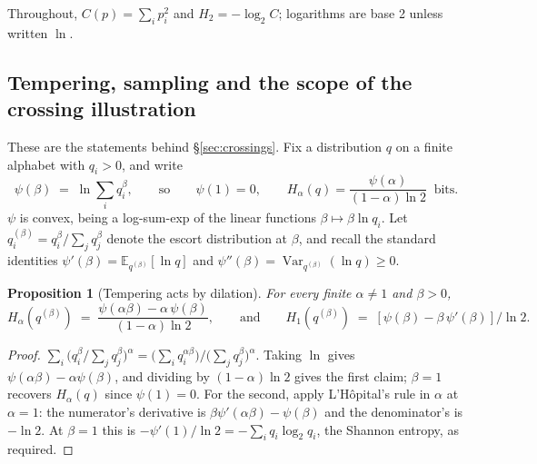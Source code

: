 \documentclass[10pt]{article}
\theoremstyle{plain}
\newtheorem{proposition}{Proposition}
\theoremstyle{definition}
\newcommand{\Htwo}{H_2}
\begin{document}
Throughout, $C(p)=\sum_i p_i^2$ and $\Htwo=-\log_2 C$; logarithms are base 2 unless written $\ln$.

\subsection{Tempering, sampling and the scope of the crossing illustration}
\label{app:crossings}

These are the statements behind \S\ref{sec:crossings}. Fix a distribution $q$ on a finite alphabet with $q_i>0$, and write
\[
\psi(\beta)\;=\;\ln\sum_i q_i^{\beta},
\qquad\text{so}\qquad \psi(1)=0,\qquad H_\alpha(q)=\frac{\psi(\alpha)}{(1-\alpha)\ln2}\ \text{ bits}.
\]
$\psi$ is convex, being a log-sum-exp of the linear functions $\beta\mapsto\beta\ln q_i$. Let $q^{(\beta)}_i=q_i^\beta/\sum_j q_j^\beta$ denote the escort distribution at $\beta$, and recall the standard identities $\psi'(\beta)=\mathbb{E}_{q^{(\beta)}}[\ln q]$ and $\psi''(\beta)=\operatorname{Var}_{q^{(\beta)}}(\ln q)\ge0$.

\begin{proposition}[Tempering acts by dilation]
\label{prop:temper}
For every finite $\alpha\ne1$ and $\beta>0$,
\[
H_\alpha\!\left(q^{(\beta)}\right)\;=\;\frac{\psi(\alpha\beta)-\alpha\,\psi(\beta)}{(1-\alpha)\ln2},
\qquad\text{and}\qquad
H_1\!\left(q^{(\beta)}\right)\;=\;[\psi(\beta)-\beta\,\psi'(\beta)]/\ln2.
\]
\end{proposition}
\begin{proof}
$\sum_i\big(q_i^\beta/\sum_j q_j^\beta\big)^\alpha=\big(\sum_i q_i^{\alpha\beta}\big)\big/\big(\sum_j q_j^{\beta}\big)^{\alpha}$. Taking $\ln$ gives $\psi(\alpha\beta)-\alpha\psi(\beta)$, and dividing by $(1-\alpha)\ln2$ gives the first claim; $\beta=1$ recovers $H_\alpha(q)$ since $\psi(1)=0$. For the second, apply L'H\^opital's rule in $\alpha$ at $\alpha=1$: the numerator's derivative is $\beta\psi'(\alpha\beta)-\psi(\beta)$ and the denominator's is $-\ln2$. At $\beta=1$ this is $-\psi'(1)/\ln2=-\sum_i q_i\log_2 q_i$, the Shannon entropy, as required.
\end{proof}
\end{document}
